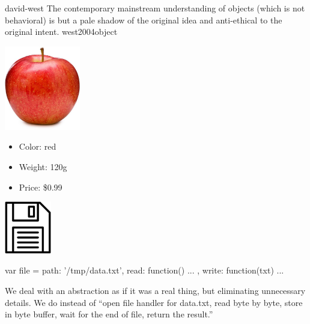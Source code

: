 \documentclass{article}
\begin{document}

\qte
  {david-west}
  {The contemporary mainstream understanding of objects (which is not behavioral) is but a pale shadow of the original idea and anti-ethical to the original intent.}
  {west2004object}



\begin{pptWide}{2}
\includegraphics[width=1.3in]{apple.jpg}
\begin{itemize}
\item Color: red
\item Weight: 120g
\item Price: \$0.99
\end{itemize}
\par\columnbreak\par
\includegraphics[width=0.8in]{file-on-disc.jpg}
\par
{\small\begin{ffcode}
var file = {
  path: '/tmp/data.txt',
  read: function() { ... },
  write: function(txt) { ... }
}
\end{ffcode}
}
\end{pptWide}
We deal with an abstraction as if it was a real thing, but eliminating unnecessary details.
We do  instead of ``open file handler for data.txt, read byte by byte, store in
byte buffer, wait for the end of file, return the result.''
\plush{}
\end{document}
